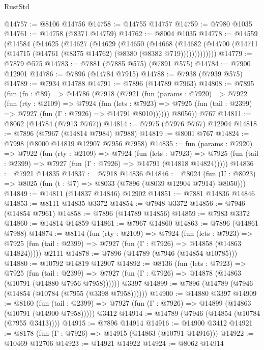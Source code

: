 \begin{lexlean}{RustStd}
\begin{coremodule}
{\begin{coremodule}
{{{{{{{{{{{{{{{{{{{{{{{{{{{{{{{{{{{{{{{{{{{{{{{{{{@14757 := @8106 @14756
@14758 := @14755 @14757
@14759 := @7980 @1035
@14761 := @14758 (@8371 @14759)
@14762 := @8004 @1035
@14778 := @14559
    (@14584
      (@14625
        (@14627
          (@14629
            (@14650
              (@14668
                (@14682
                  (@14700 (@14711 (@14715 (@14761 (@8375 @14762) (@8380 (@8382 @719)))))))))))))
@14779 := @7879 @575
@14783 := @7881 (@7885 @575) (@7891 @575)
@14784 := @7900 @12901
@14786 := @7896 (@14784 @7915)
@14788 := @7938 (@7939 @575)
@14789 := @7934 @14788
@14791 := @7896 (@14789 @7963)
@14808 := @7895
    (fun (fn : @89) =>
    @14786
      (@7918
        (@7921
          (fun (params : @7920) =>
          @7922
            (fun (rty : @2109) =>
            @7924
              (fun (lets : @7923) =>
              @7925 (fun (tail : @2399) => @7927 (fun (Γ : @7926) => @14791 @8010))))))
        @8056))
    @767
@14811 := @8062 (@14784 (@7913 @767))
@14814 := @7975 (@7976 @767) @12904
@14818 := @7896 (@7967 (@14814 @7984) @7988)
@14819 := @8001 @767
@14824 := @7998 (@8000 @14819 @12907 @7956 @7958)
@14835 := fun (params : @7920) =>
  @7922
    (fun (rty : @2109) =>
    @7924
      (fun (lets : @7923) =>
      @7925 (fun (tail : @2399) => @7927 (fun (Γ : @7926) => @14791 (@14818 @14824)))))
@14836 := @7921 @14835
@14837 := @7918 @14836
@14846 := @8024
    (fun (U : @8023) => @8025 (fun (t : @7) => @8033 (@7896 (@8039 @12904 @7914) @8050)))
@14849 := @14811 (@14837 @14846) @12902
@14851 := @7881 @14836 @14846
@14853 := @8111 @14835 @3372
@14854 := @7948 @3372
@14856 := @7946 (@14854 @7961)
@14858 := @7896 (@14789 @14856)
@14859 := @7983 @3372
@14860 := @14814 @14859
@14861 := @7967 @14860
@14863 := @7896 (@14861 @7988)
@14874 := @8114
    (fun (rty : @2109) =>
    @7924
      (fun (lets : @7923) =>
      @7925 (fun (tail : @2399) => @7927 (fun (Γ : @7926) => @14858 (@14863 @14824)))))
    @2111
@14878 := @7896 (@14789 (@7946 (@14854 @10785)))
@14880 := @10792 @14819 @12907
@14892 := @8136
    (fun (lets : @7923) =>
    @7925
      (fun (tail : @2399) =>
      @7927 (fun (Γ : @7926) => @14878 (@14863 (@10791 (@14880 @7956 @7958))))))
    @3397
@14899 := @7896 (@14789 (@7946 (@14854 (@10784 (@7955 (@3398 @7958))))))
@14900 := @14880 @3397
@14909 := @8160
    (fun (tail : @2399) => @7927 (fun (Γ : @7926) => @14899 (@14863 (@10791 (@14900 @7958)))))
    @3412
@14914 := @14789 (@7946 (@14854 (@10784 (@7955 @3413))))
@14915 := @7896 @14914
@14916 := @14900 @3412
@14921 := @8178 (fun (Γ : @7926) => @14915 (@14863 (@10791 @14916)))
@14922 := @10469 @12706
@14923 := @14921 @14922
@14924 := @8062 @14914
}}}}}}}}}}}}}}}}}}}}}}}}}}}}}}}}}}}}}}}}}}}}}}}}}}
\end{coremodule}}
\end{coremodule}
\end{lexlean}
